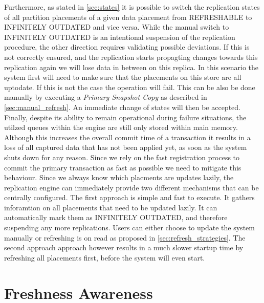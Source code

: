 Furthermore, as stated in \ref{sec:states} it is possible to switch the replication states of all partition placements of a given data placement from REFRESHABLE to 
INFINITELY OUTDATED and vice versa.
While the manual switch to INFINITELY OUTDATED is an intentional suspension of the replication procedure, the other direction requires validating possible deviations.
If this is not correctly ensured, and the replication starts propagting changes towards this replication again we will lose data in between on this replica.
In this scenario the system first will need to make sure that the placements on this store are all uptodate. If this is not the case the operation will fail. 
This can be also be done manually by executing a \emph{Primary Snapshot Copy} as described in \ref{sec:manual_refresh}. An immediate change of states will then be accepted.\\

Finally, despite its ability to remain operational during failure situations, the utilzed queues within the engine are still only stored within main memory.
Although this increases the overall commit time of a transaction it results in a loss of all captured data that has not been applied yet, as soon as the system 
shuts down for any reason. Since we rely on the fast registration process to commit the primary transaction as fast as possible we need to mitigate this behaviour.
Since we always know which placments are updates lazily, the replication engine can immediately provide two different mechanisms that can be centrally configured. 
The first approach is simple and fast to execute. It gathers inforamtion on all placements that need to be updated lazily. It can automatically mark them as INFINITELY OUTDATED, 
and therefore suspending any more replications. Users can either choose to update the system manually or refreshing is on read as proposed in \ref{sec:refresh_strategies}.
The second approach approach however results in a much slower startup time by refreshing all placements first, before the system will even start.









\section{Freshness Awareness}

